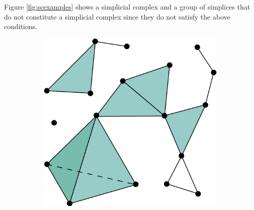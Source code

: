 Figure \ref{fig:scexamples} shows a simplicial complex and a group of
simplices that do not constitute a simplicial complex since they do not satisfy
the above conditions.

\begin{figure}
        \centering
        \begin{subfigure}[b]{0.4\textwidth}
                \includegraphics[width=\textwidth]{img/wiki_simplcialcomplex.png}
        \end{subfigure}%
        \qquad
        \begin{subfigure}[b]{0.3\textwidth}

\end{subfigure}
\end{figure}

